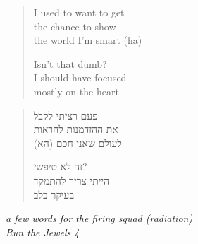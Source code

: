\clearpage\thispagestyle{empty}\vspace*{\fill}

\begin{otherlanguage}{english}
\begin{verse}
I used to want to get \\
the chance to show \\
the world I'm smart (ha)

Isn't that dumb? \\
I should have focused \\
mostly on the heart
\end{verse}
\end{otherlanguage}
\begin{verse}\small
פעם רציתי לקבל \\
את ההזדמנות להראות \\
לעולם שאני חכם (הא)

זה לא טיפשי? \\
הייתי צריך להתמקד \\
בעיקר בלב
\end{verse}
\begin{otherlanguage}{english}
\begin{flushright}\small\itshape
a few words for the firing squad (radiation) \\
Run the Jewels 4
\end{flushright}
\end{otherlanguage}

\vspace*{\fill}\clearpage
